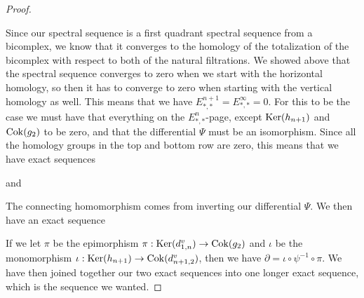 \begin{proof}
\begin{center}
\end{center}
Since our spectral sequence is a first quadrant spectral sequence from a bicomplex, we know that it converges to the homology of the totalization of the bicomplex with respect to both of the natural filtrations. We showed above that the spectral sequence converges to zero when we start with the horizontal homology, so then it has to converge to zero when starting with the vertical homology as well. This means that we have $E_{*,*}^{n+1} = E_{*,*}^{\infty} = 0$. For this to be the case we must have that everything on the $E_{*,*}^n$-page, except $\operatorname{Ker}(h_{n+1})$ and $\operatorname{Cok}(g_2)$ to be zero, and that the differential $\Psi$ must be an isomorphism. Since all the homology groups in the top and bottom row are zero, this means that we have exact sequences 

\begin{center}
\end{center}
and
\begin{center}
\end{center}
The connecting homomorphism comes from inverting our differential $\Psi$. We then have an exact sequence
\begin{center}
\end{center}
If we let $\pi$ be the epimorphism $\pi: \operatorname{Ker}(d^v_{1,n})\to \operatorname{Cok}(g_2)$ and $\iota$ be the monomorphism $\iota: \operatorname{Ker}(h_{n+1})\to \operatorname{Cok}(d^v_{n+1,2})$, then we have $\partial = \iota \circ \psi^{-1}\circ \pi$. We have then joined together our two exact sequences into one longer exact sequence, which is the sequence we wanted. 
\end{proof}

